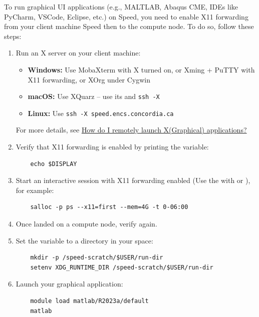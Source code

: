 To run graphical UI applications (e.g., MALTLAB, Abaqus CME, IDEs like PyCharm, VSCode, Eclipse, etc.) on Speed,
you need to enable X11 forwarding from your client machine Speed then to the compute node.
To do so, follow these steps:
\begin{enumerate}
\item Run an X server on your client machine:
\begin{itemize}
    \item \textbf{Windows:} Use MobaXterm with X turned on, or Xming + PuTTY with X11 forwarding, or XOrg under Cygwin
    \item \textbf{macOS:} Use XQuarz -- use its  and \texttt{ssh -X}
    \item \textbf{Linux:} Use \texttt{ssh -X speed.encs.concordia.ca}
\end{itemize}
For more details, see \href{https://www.concordia.ca/ginacody/aits/support/faq/xserver.html}{How do I remotely launch X(Graphical) applications?}

\item Verify that X11 forwarding is enabled by printing the  variable:
\begin{verbatim}
    echo $DISPLAY
\end{verbatim}

\item Start an interactive session with X11 forwarding enabled (Use the  with  or ), for example:
\begin{verbatim}
    salloc -p ps --x11=first --mem=4G -t 0-06:00
\end{verbatim}

\item Once landed on a compute node, verify  again.

\item Set the  variable to a directory in your  space:
\begin{verbatim}
    mkdir -p /speed-scratch/$USER/run-dir
    setenv XDG_RUNTIME_DIR /speed-scratch/$USER/run-dir
\end{verbatim}

\item Launch your graphical application:
\begin{verbatim}
    module load matlab/R2023a/default
    matlab
\end{verbatim}
\end{enumerate}

